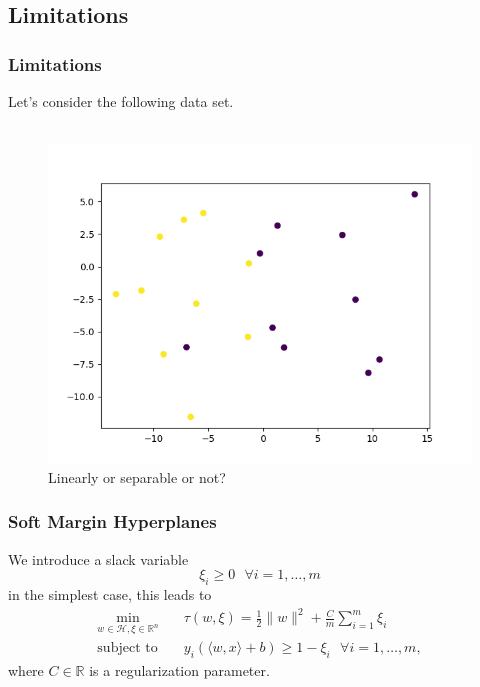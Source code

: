 \documentclass{beamer}
\begin{document}
\subsection{Limitations}

\begin{frame}{}
	\frametitle{Limitations}
	Let's consider the following data set. \\~\\ 
	\begin{figure}
		\centering
		\includegraphics[width=0.7\linewidth]{img/SlackData}
		\caption{Linearly or separable or not?}
		\label{fig:slackdata}
	\end{figure}
\end{frame}

\begin{frame}{}
	\frametitle{Soft Margin Hyperplanes}
	We introduce a slack variable
	\begin{equation}
		\xi_{ i } \geq 0 \text{ } \forall i = {1, \dots, m}
	\end{equation}
	in the simplest case, this leads to 
	\begin{equation}
		\begin{aligned}
			\min_{w \in \mathcal{H}, \xi \in \mathbb{R}^{n}} \quad & \tau (w, \xi) = \frac{1}{2} \lVert w \rVert^2 + \frac{C}{m} \sum_{i=1}^{m} \xi_{i} \\
			\textrm{subject to} \quad & y_{i} \left( \langle w,x \rangle + b \right) \geq 1 - \xi_{i} \text{ } \forall i = {1, \dots, m}, 
		\end{aligned}
	\end{equation}
    where $C \in \mathbb{R}$ is a regularization parameter.
\end{frame}
\end{document}
